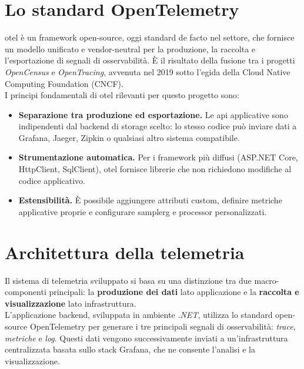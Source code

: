 \section{Lo standard OpenTelemetry}

\gls{otel} \`e un framework open-source, oggi standard de facto nel settore, che fornisce
un modello unificato e vendor-neutral per la produzione, la raccolta e l'esportazione di
segnali di osservabilit\`a. \`E il risultato della fusione tra i progetti \emph{OpenCensus}
e \emph{OpenTracing}, avvenuta nel 2019 sotto l'egida della Cloud Native Computing
Foundation (CNCF).\\
I principi fondamentali di \gls{otel} rilevanti per questo progetto sono:

\begin{itemize}
      \item \textbf{Separazione tra produzione ed esportazione.} Le \gls{api} applicative sono
            indipendenti dal backend di storage scelto: lo stesso codice pu\`o inviare dati a
            Grafana, Jaeger, Zipkin o qualsiasi altro sistema compatibile.
      \item \textbf{Strumentazione automatica.} Per i framework pi\`u diffusi (ASP.NET Core,
            HttpClient, SqlClient), \gls{otel} fornisce librerie che non richiedono modifiche
            al codice applicativo.
      \item \textbf{Estensibilit\`a.} \`E possibile aggiungere attributi custom, definire
            metriche applicative proprie e configurare \gls{samplerg} e processor personalizzati.
\end{itemize}

\section{Architettura della telemetria}

Il sistema di telemetria sviluppato si basa su una distinzione tra due macro-componenti principali: la \textbf{produzione dei dati} lato applicazione e la \textbf{raccolta e visualizzazione} lato infrastruttura.\\
L’applicazione backend, sviluppata in ambiente \textit{.NET}, utilizza lo standard open-source OpenTelemetry per generare i tre principali segnali di osservabilità: \textit{trace}, \textit{metriche} e \textit{log}. Questi dati vengono successivamente inviati a un’infrastruttura centralizzata basata sullo stack Grafana, che ne consente l’analisi e la visualizzazione.

